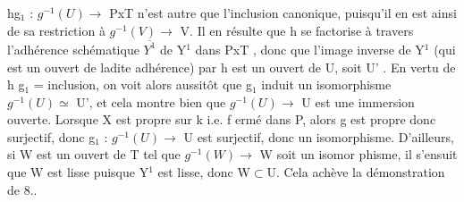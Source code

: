 
hg$_1$ :  $g^{-1}(U) \longrightarrow$ PxT  n'est autre que l'inclusion canonique, puisqu'il
en est ainsi de sa restriction à $g^{-1}(V) \rightarrow$ V.  
 Il en résulte que h  se factorise
à travers l'adhérence schématique  $\overline{Y^1}$ de Y$^1$ dans  PxT , donc que
l'image inverse de Y$^1$ (qui est un ouvert de ladite adhérence) par h
est un ouvert de U, soit U' . En vertu de  h g$_1$ = inclusion, on
voit alors aussitôt que  g$_1$ induit un isomorphisme  $g^{-1}(U) \simeq$ U', et
 cela montre bien que  $g^{-1}(U) \longrightarrow$ U est une immersion ouverte.
Lorsque X est propre sur k i.e. f ermé dans P, alors  g est propre donc
surjectif, donc  g$_1$ : $g^{-1}(U) \longrightarrow$ U est surjectif, donc un isomorphisme.
D'ailleurs, si  W est un ouvert de T tel que  $g^{-1}(W) \longrightarrow$ W soit un isomor%
phisme, il s'ensuit que W est lisse puisque Y$^1$ est lisse, donc W$\subset$U.
Cela achève la démonstration de 8.. 

